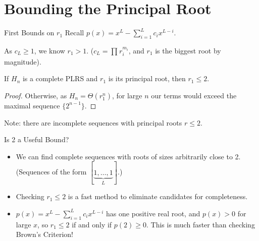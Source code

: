 \documentclass[handout]{beamer}
\begin{document}
\section{Bounding the Principal Root}
\begin{frame}{First Bounds on $r_1$}
Recall $p(x)=x^{L}-\sum_{i=1}^{L}c_{i}x^{L-i}$.

	\pause
As  $c_{L} \geq 1$, we know $r_1>1$. ($c_{L}=\prod_{}^{}r_{i}^{m_{i}}$, and $r_1$ is the biggest root by magnitude). 

\pause
\begin{lemma}[SMALL 2020]
If $H_n$ is a complete PLRS and $r_1$ is its principal root, then $r_1\leq 2$.
\end{lemma}
\pause
\begin{proof}
	Otherwise, as $H_{n}=\Theta \left( r_1^{n} \right) $, for large $n$ our terms would exceed the maximal sequence $\{ 2^{n-1} \}$.
\end{proof}
	\pause
 Note: there are incomplete sequences with principal roots $r \leq 2$.


\end{frame}
\begin{frame}{Is 2 a Useful Bound?}
	\begin{itemize}
	\item
		We can find complete sequences with roots of sizes arbitrarily close to 2. %
		(Sequences of the form $[\underbrace{1,\ldots,1}_{L}]$.)
	\pause
\item
Checking $r_1\leq 2$ is a fast method to eliminate candidates for completeness. %
\pause
\item
	$p(x)=x^{L}-\sum_{i=1}^{L}c_{i}x^{L-i}$ has one positive real root, and $p(x)>0$ for large $x$, so $r_1\leq 2$ if and only if $p(2)\geq 0$. \pause This is much faster than checking Brown's Criterion!
	\end{itemize}
\end{frame}
\end{document}

